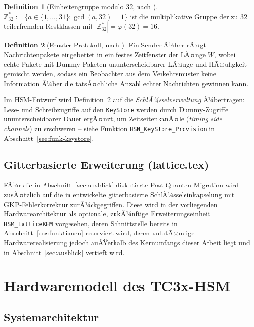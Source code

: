 ﻿\documentclass[a4paper,12pt]{article}
\theoremstyle{definition}
\newtheorem{definition}{Definition}
\begin{document}
\begin{definition}[Einheitengruppe modulo 32, nach \cite{Epp26c}]
	\label{def:z32}
	$\mathbb{Z}_{32}^* := \{a \in \{1,\ldots,31\} : \gcd(a,32) = 1\}$ ist die multiplikative Gruppe der zu $32$ teilerfremden Restklassen mit $|\mathbb{Z}_{32}^*| = \varphi(32) = 16$.
\end{definition}

\begin{definition}[Fenster-Protokoll, nach \cite{Epp26c}]
	\label{def:fenster}
	Ein Sender Ã¼bertrÃ¤gt Nachrichtenpakete eingebettet in ein festes Zeitfenster der LÃ¤nge $W$, wobei echte Pakete mit Dummy-Paketen ununterscheidbarer LÃ¤nge und HÃ¤ufigkeit gemischt werden, sodass ein Beobachter aus dem Verkehrsmuster keine Information Ã¼ber die tatsÃ¤chliche Anzahl echter Nachrichten gewinnen kann.
\end{definition}

Im HSM-Entwurf wird Definition~\ref{def:fenster} auf die \emph{SchlÃ¼sselverwaltung} Ã¼bertragen: Lese- und Schreibzugriffe auf den \texttt{KeyStore} werden durch Dummy-Zugriffe ununterscheidbarer Dauer ergÃ¤nzt, um ZeitseitenkanÃ¤le (\emph{timing side channels}) zu erschweren -- siehe Funktion \texttt{HSM\_KeyStore\_Provision} in Abschnitt~\ref{sec:funk-keystore}.

\subsection{Gitterbasierte Erweiterung (lattice.tex)}

FÃ¼r die in Abschnitt~\ref{sec:ausblick} diskutierte Post-Quanten-Migration wird zusÃ¤tzlich auf die in \cite{Epp26d} entwickelte gitterbasierte SchlÃ¼sseleinkapselung mit GKP-Fehlerkorrektur zurÃ¼ckgegriffen. Diese wird in der vorliegenden Hardwarearchitektur als optionale, zukÃ¼nftige Erweiterungseinheit \texttt{HSM\_LatticeKEM} vorgesehen, deren Schnittstelle bereits in Abschnitt~\ref{sec:funktionen} reserviert wird, deren vollstÃ¤ndige Hardwarerealisierung jedoch auÃŸerhalb des Kernumfangs dieser Arbeit liegt und in Abschnitt~\ref{sec:ausblick} vertieft wird.

\section{Hardwaremodell des TC3x-HSM}
\label{sec:hwmodell}

\subsection{Systemarchitektur}
\end{document}
